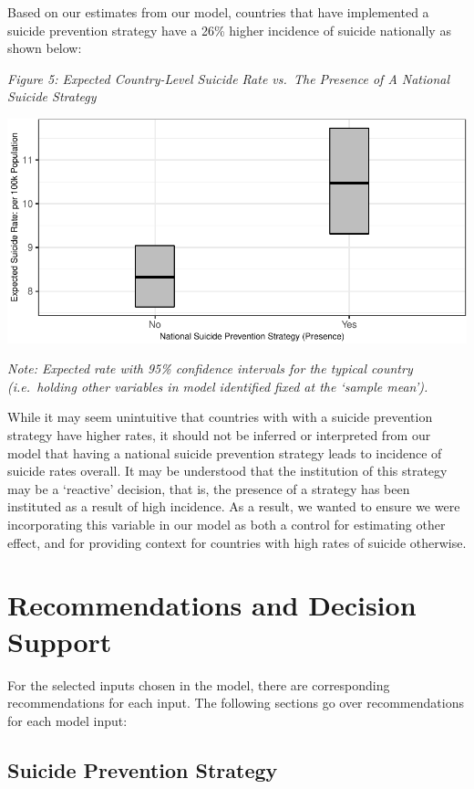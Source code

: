 \documentclass[]{article}
\begin{document}
Based on our estimates from our model, countries that have implemented a
suicide prevention strategy have a 26\% higher incidence of suicide
nationally as shown below:

\emph{Figure 5: Expected Country-Level Suicide Rate vs.~The Presence of
A National Suicide Strategy}

\begin{center}\includegraphics{Project_Report_files/figure-latex/sstrat_plot-1} \end{center}

\emph{Note: Expected rate with 95\% confidence intervals for the typical
country (i.e.~holding other variables in model identified fixed at the
`sample mean').}

While it may seem unintuitive that countries with with a suicide
prevention strategy have higher rates, it should not be inferred or
interpreted from our model that having a national suicide prevention
strategy leads to incidence of suicide rates overall. It may be
understood that the institution of this strategy may be a `reactive'
decision, that is, the presence of a strategy has been instituted as a
result of high incidence. As a result, we wanted to ensure we were
incorporating this variable in our model as both a control for
estimating other effect, and for providing context for countries with
high rates of suicide otherwise.

\section{Recommendations and Decision
Support}\label{recommendations-and-decision-support}

For the selected inputs chosen in the model, there are corresponding
recommendations for each input. The following sections go over
recommendations for each model input:

\subsection{Suicide Prevention
Strategy}\label{suicide-prevention-strategy}
\end{document}
